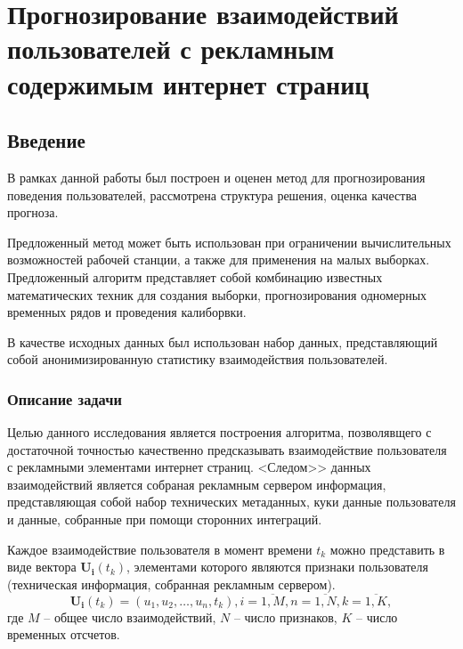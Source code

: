 \documentclass[a4paper, 14pt]{extreport}
\begin{document}
    \chapter{Прогнозирование взаимодействий пользователей с рекламным содержимым интернет страниц}
    \section{Введение}

    В рамках данной работы был построен и оценен метод для прогнозирования поведения пользователей, рассмотрена
    структура решения, оценка качества прогноза.

    Предложенный метод может быть использован при ограничении вычислительных возможностей рабочей станции, 
    а также для применения на малых выборках. Предложенный алгоритм представляет собой комбинацию 
    известных математических техник для создания выборки, прогнозирования одномерных временных рядов и проведения калиборвки.

    В качестве исходных данных был использован набор данных, представляющий собой анонимизированную статистику
    взаимодействия пользователей.

    \subsection*{Описание задачи}

    Целью данного исследования является построения алгоритма, позволявщего с достаточной точностью качественно
    предсказывать взаимодействие пользователя с рекламными элементами интернет страниц.
    <Следом>> данных взаимодействий является собраная рекламным сервером информация, представляющая собой набор
    технических метаданных, куки данные пользователя и данные, собранные при помощи сторонних интеграций.

    Каждое взаимодействие пользователя в момент времени $t_k$ можно представить в виде вектора $\mathbf{U_i}(t_k)$,
    элементами которого являются признаки пользователя (техническая информация, собранная рекламным сервером).
    \begin{equation}
        \mathbf{U_i}\left(t_k\right) =
        \left( u_1, u_2, \dots, u_n, t_k \right),
        i = \overline{1, M}, n = \overline{1, N}, k = \overline{1, K},
    \end{equation} где $M$ -- общее число взаимодействий, $N$ -- число признаков, $K$ -- число временных отсчетов.
\end{document}
